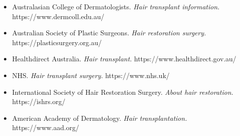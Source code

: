 \begin{itemize}
    \item Australasian College of Dermatologists. \textit{Hair transplant information.} https://www.dermcoll.edu.au/
    \item Australian Society of Plastic Surgeons. \textit{Hair restoration surgery.} https://plasticsurgery.org.au/
    \item Healthdirect Australia. \textit{Hair transplant.} https://www.healthdirect.gov.au/
    \item NHS. \textit{Hair transplant surgery.} https://www.nhs.uk/
    \item International Society of Hair Restoration Surgery. \textit{About hair restoration.} https://ishrs.org/
    \item American Academy of Dermatology. \textit{Hair transplantation.} https://www.aad.org/
\end{itemize}

